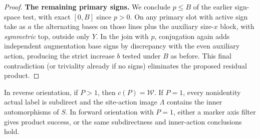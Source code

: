 \begin{proof}
\noindent\textbf{The remaining primary signs.} We conclude \(p\le B\) of the earlier sign-space test, with exact \([0,B]\) since \(p>0\). On any primary slot with active sign take as \(a\) the alternating bases on those lines plus the auxiliary size-\(x\) block, with \emph{symmetric} top, outside only \(Y\). In the join with \(p\), conjugation again adds independent augmentation base signs by discrepancy with the even auxiliary action, producing the strict increase \(b\) tested under \(B\) as before. This final contradiction (or triviality already if no signs) eliminates the proposed residual product.
\end{proof}

\begin{proposition}\label{t:weighted-reverse-projections}
In reverse orientation, if \(P>1\), then \(c(P)=\mathcal W\).
If \(P=1\), every nonidentity actual label is subdirect and the site-action
image \(\Lambda\) contains the inner automorphisms of \(S\).
In forward orientation with \(P=1\), either a marker axis filter gives
product success, or the same subdirectness and inner-action conclusions hold.
\end{proposition}
